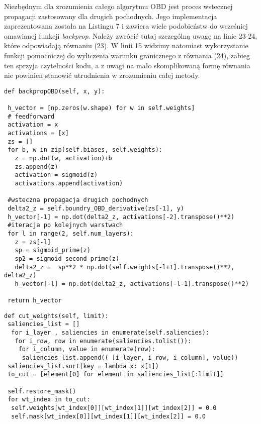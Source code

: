\par Niezbędnym dla zrozumienia całego algorytmu OBD jest proces wstecznej propagacji zastosowany dla drugich pochodnych. Jego implementacja zaprezentowana została na Listingu 7 i zawiera wiele podobieństw do wcześniej omawianej funkcji \emph{backprop}. Należy zwrócić tutaj szczególną uwagę na linie 23-24, które odpowiadają równaniu (23). W linii 15 widzimy natomiast wykorzystanie funkcji pomocniczej do wyliczenia warunku granicznego z równania (24), zabieg ten sprzyja czytelności kodu, a z uwagi na mało skomplikowaną formę równania nie powinien stanowić utrudnienia w zrozumieniu całej metody.
\begin{listing}[!htb]
\begin{verbatim}
def backpropOBD(self, x, y):
        
 h_vector = [np.zeros(w.shape) for w in self.weights]
 # feedforward
 activation = x
 activations = [x] 
 zs = []
 for b, w in zip(self.biases, self.weights):
   z = np.dot(w, activation)+b
   zs.append(z)
   activation = sigmoid(z)
   activations.append(activation)
   
 #wsteczna propagacja drugich pochodnych
 delta2_z = self.boundry_OBD_derivative(zs[-1], y)
 h_vector[-1] = np.dot(delta2_z, activations[-2].transpose()**2)
 #iteracja po kolejnych warstwach
 for l in range(2, self.num_layers):
   z = zs[-l]
   sp = sigmoid_prime(z)
   sp2 = sigmoid_second_prime(z)    
   delta2_z =  sp**2 * np.dot(self.weights[-l+1].transpose()**2, delta2_z)             
   h_vector[-l] = np.dot(delta2_z, activations[-l-1].transpose()**2)
           
 return h_vector
\end{verbatim}
\end{listing}

\begin{listing}[!htb]
\begin{verbatim}
def cut_weights(self, limit):
 saliencies_list = []
  for i_layer , saliencies in enumerate(self.saliencies):
   for i_row, row in enumerate(saliencies.tolist()):
    for i_column, value in enumerate(row):
     saliencies_list.append(( [i_layer, i_row, i_column], value))                    
 saliencies_list.sort(key = lambda x: x[1])
 to_cut = [element[0] for element in saliencies_list[:limit]]
 
 self.restore_mask()
 for wt_index in to_cut:
  self.weights[wt_index[0]][wt_index[1]][wt_index[2]] = 0.0
  self.mask[wt_index[0]][wt_index[1]][wt_index[2]] = 0.0
\end{verbatim}
\end{listing}

